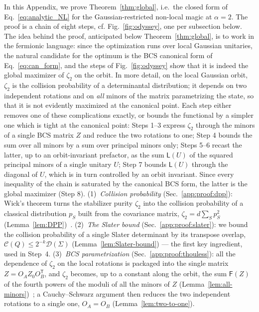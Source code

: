 \documentclass[prx,twocolumn,superscriptaddress,aps,10pt, frontmatterverbose, reprint,footinbib,longbibliography=true]{revtex4-2}
\newcommand{\trans}{\mathsf{T}}
\newcommand{\RENYI}{\alpha}
\providecommand{\DIFaddtex}[1]{{\protect\color{red}#1}} %
\providecommand{\DIFaddbegin}{\protect\color{red}} %
\providecommand{\DIFaddend}{\protect\color{black}} %
\providecommand{\DIFaddtex}[1]{\texorpdfstring{\DIFaddtex{#1}}{#1}} %
\providecommand{\DIFadd}[1]{\texorpdfstring{\DIFaddtex{#1}}{#1}} %
\newcommand{\DIFaddincludegraphics}[2][]{{\color{blue}\fbox{\DIFOincludegraphics[#1]{#2}}}} %
\DeclareRobustCommand{\DIFaddbegin}{\DIFOaddbegin \let\includegraphics\DIFaddincludegraphics} %
\DeclareRobustCommand{\DIFaddend}{\DIFOaddend \let\includegraphics\DIFOincludegraphics} %
\begin{document}
In this Appendix, we prove Theorem~\ref{thm:global}, i.e.\ the closed form of Eq.~\eqref{eq:analytic_NL} for the Gaussian-restricted non-local magic at $\RENYI=2$. The proof is a chain of eight steps, cf. Fig.~\ref{fig:odyssey}, one per subsection below.
\DIFaddbegin \DIFadd{The idea behind the proof, anticipated below Theorem~\ref{thm:global}, is to work in the fermionic language: since the optimization runs over local Gaussian unitaries, the natural candidate for the optimum is the BCS canonical form of Eq.~\eqref{eq:can_form}, and the steps of Fig.~\ref{fig:odyssey} show that it is indeed the global maximizer of $\zeta_2$ on the orbit. In more detail, on the local Gaussian orbit, $\zeta_2$ is the collision probability of a determinantal distribution; it depends on two independent rotations and on \emph{all} minors of the matrix parametrizing the state, so that it is not evidently maximized at the canonical point. Each step either removes one of these complications exactly, or bounds the functional by a simpler one which is tight at the canonical point: Steps 1--3 express $\zeta_2$ through the minors of a single BCS matrix $Z$ and reduce the two rotations to one; Step 4 bounds the sum over all minors by a sum over principal minors only; Steps 5--6 recast the latter, up to an orbit-invariant prefactor, as the sum $\mathsf{L}(U)$ of the squared principal minors of a single unitary $U$; Step 7 bounds $\mathsf{L}(U)$ through the diagonal of $U$, which is in turn controlled by an orbit invariant. Since every inequality of the chain is saturated by the canonical BCS form, the latter is the global maximizer (Step 8).
}\DIFaddend (1)~\emph{Collision probability} (Sec.~\ref{app:proof:dpp}):  Wick's theorem turns the stabilizer purity $\zeta_2$ into the collision probability of a classical distribution $p_S$  built from the covariance matrix, $\zeta_2=d\sum_Sp_S^2$ (Lemma~\ref{lem:DPP})~\cite{collura2026nonstabilizernessfermionicgaussianstates}.
(2)~\emph{The Slater bound}  (Sec.~\ref{app:proof:slater}): we bound the collision probability of a single Slater determinant by its transpose overlap, $\mathcal{C}(Q)\le2^{-k}\mathcal{D}(\Sigma)$ (Lemma~\ref{lem:Slater-bound}) --- the first key ingredient, used in Step~4.
(3)~\emph{BCS parametrization} (Sec.~\ref{app:proof:thouless}): all the dependence of $\zeta_2$ on the local rotations is packaged into the single matrix $Z=O_AZ_0O_B^{\trans}$, and $\zeta_2$ becomes, up to a constant along the orbit, the sum $\mathsf{F}(Z)$ of the fourth powers of the moduli of all the minors of $Z$ (Lemma~\ref{lem:all-minors})~\cite{Mbeng2024,surace}; a Cauchy--Schwarz argument then reduces the two independent rotations to a single one, $O_A=O_B$  (Lemma~\ref{lem:two-to-one}).
\end{document}
